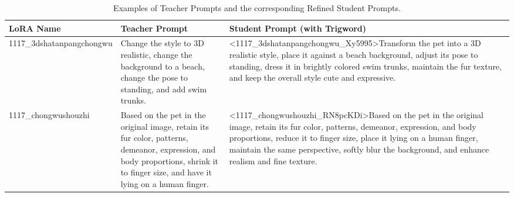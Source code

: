 \begin{table}[htbp]
\centering
\caption{Examples of Teacher Prompts and the corresponding Refined Student Prompts.}
\label{tab:prompt_comparison}
\footnotesize %
\renewcommand{\arraystretch}{1.3} %
\begin{tabularx}{\textwidth}{@{} l X X @{}}
\toprule
\textbf{LoRA Name} & \textbf{Teacher Prompt} & \textbf{Student Prompt (with Trigword)} \\
\midrule

1117\_3dshatanpangchongwu & 
Change the style to 3D realistic, change the background to a beach, change the pose to standing, and add swim trunks. & 
\textless 1117\_\allowbreak 3dshatanpangchongwu\_\allowbreak Xy5995\textgreater Transform the pet into a 3D realistic style, place it against a beach background, adjust its pose to standing, dress it in brightly colored swim trunks, maintain the fur texture, and keep the overall style cute and expressive. \\

\addlinespace %

1117\_chongwushouzhi & 
Based on the pet in the original image, retain its fur color, patterns, demeanor, expression, and body proportions, shrink it to finger size, and have it lying on a human finger. & 
\textless 1117\_\allowbreak chongwushouzhi\_\allowbreak RN8pcKDi\textgreater Based on the pet in the original image, retain its fur color, patterns, demeanor, expression, and body proportions, reduce it to finger size, place it lying on a human finger, maintain the same perspective, softly blur the background, and enhance realism and fine texture. \\

\bottomrule
\end{tabularx}
\end{table}